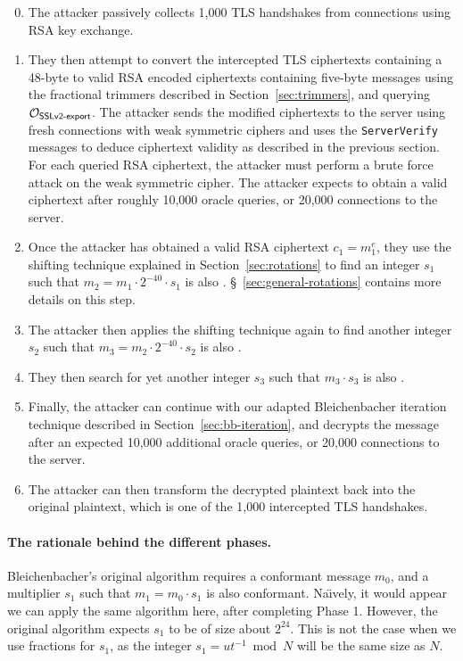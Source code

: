 \begin{enumerate}
 \setcounter{enumi}{-1}
	\item The attacker passively collects 1,000 TLS handshakes from
	connections using RSA key exchange.

	\item They then attempt to convert the intercepted TLS ciphertexts containing a 48-byte \pms to valid RSA \PKCS encoded ciphertexts containing five-byte messages using the fractional trimmers described in Section~\ref{sec:trimmers}, and querying $\mathcal{O}_\textsf{SSLv2-export}$. The attacker sends the modified ciphertexts to the server using fresh \ssltwo connections with weak symmetric ciphers and uses the \texttt{ServerVerify} messages to deduce ciphertext validity as described in the previous section. For each queried RSA ciphertext, the attacker must perform a brute force attack on the weak symmetric cipher. The attacker expects to obtain a valid \ssltwo ciphertext after roughly 10,000 oracle queries, or 20,000 connections to the server.

	\item Once the attacker has obtained a valid \ssltwo RSA ciphertext
	$c_1 = m_1^e$, they use the shifting technique explained in
	Section~\ref{sec:rotations} to find an integer $s_1$ such that
	$m_2 = m_1 \cdot 2^{-40} \cdot s_1$ is also \sslconform.
	\S~\ref{sec:general-rotations} contains more details on this step.

	\item The attacker then applies the shifting technique again to find
	another integer $s_2$ such that $m_3 = m_2 \cdot 2^{-40} \cdot s_2$
	is also \sslconform.

	\item They then search for yet another integer $s_3$ such that
	$m_3 \cdot s_3$ is also \sslconform.

	\item Finally, the attacker can continue with our adapted Bleichenbacher
	iteration technique described in Section~\ref{sec:bb-iteration}, and
	decrypts the message after an expected 10,000 additional oracle queries,
	or 20,000 connections to the server.

	\item The attacker can then transform the decrypted plaintext back into
	the original plaintext, which is one of the 1,000 intercepted TLS 		handshakes.

\end{enumerate}

\paragraph{The rationale behind the different phases.}
Bleichenbacher's original algorithm requires a conformant message $m_0$, and a multiplier $s_1$ such that $m_1 = m_0 \cdot s_1$ is also conformant.
Na\"{\i}vely, it would appear we can apply the same algorithm here, after completing Phase 1.
However, the original algorithm expects $s_1$ to be of size about $2^{24}$. This is not the case when we use fractions for $s_1$, as the integer $s_1 = u t^{-1} \bmod N$ will be the same size as $N$.

